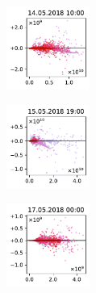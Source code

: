 \begin{figure}[H]
    \centering
    \begin{subfigure}
        \centering
        \includegraphics[width=0.30\textwidth,valign=t]{evaluation/figures/perturbations/perturbation-14.05.2018:10.00-aerosols-mul-1.01.pdf}
    \end{subfigure}
    \begin{subfigure}
        \centering
        \includegraphics[width=0.30\textwidth,valign=t]{evaluation/figures/perturbations/perturbation-15.05.2018:19.00-aerosols-mul-1.01.pdf}
    \end{subfigure}
    \begin{subfigure}
        \centering
        \includegraphics[width=0.30\textwidth,valign=t]{evaluation/figures/perturbations/perturbation-17.05.2018:00.00-aerosols-mul-1.01.pdf}
    \end{subfigure}


\end{figure}
